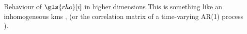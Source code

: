 \documentclass[aspectratio=169]{beamer}
\begin{document}
\begin{frame}{Behaviour of $\gls{rho}[i]$ in higher dimensions}
    {\footnotesize This is something like an inhomogeneous \gls{kms} \parencite{Kac1953}, (or the
    correlation matrix of a time-varying AR(1) process \parencite{Charbonnier1987}).}


\end{frame}

%
%
%
\end{document}
